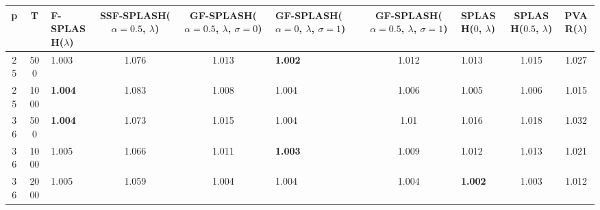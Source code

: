 \begin{tabular}{cclcclclcc}
\hline
  p  &  T   & F-SPLASH($\lambda$)   &  SSF-SPLASH($\alpha=0.5$, $\lambda$)  &  GF-SPLASH($\alpha=0.5$, $\lambda$, $\sigma=0$)  & GF-SPLASH($\alpha=0$, $\lambda$, $\sigma=1$)   &  GF-SPLASH($\alpha=0.5$, $\lambda$, $\sigma=1$)  & SPLASH($0$, $\lambda$)   &  SPLASH($0.5$, $\lambda$)  &  PVAR($\lambda$)  \\
\hline
 25  & 500  & 1.003                 &                 1.076                 &                      1.013                       & \textbf{1.002}                                 &                      1.012                       & 1.013                    &           1.015            &       1.027       \\
 25  & 1000 & \textbf{1.004}        &                 1.083                 &                      1.008                       & 1.004                                          &                      1.006                       & 1.005                    &           1.006            &       1.015       \\
 36  & 500  & \textbf{1.004}        &                 1.073                 &                      1.015                       & 1.004                                          &                       1.01                       & 1.016                    &           1.018            &       1.032       \\
 36  & 1000 & 1.005                 &                 1.066                 &                      1.011                       & \textbf{1.003}                                 &                      1.009                       & 1.012                    &           1.013            &       1.021       \\
 36  & 2000 & 1.005                 &                 1.059                 &                      1.004                       & 1.004                                          &                      1.004                       & \textbf{1.002}           &           1.003            &       1.012       \\
\hline
\end{tabular}